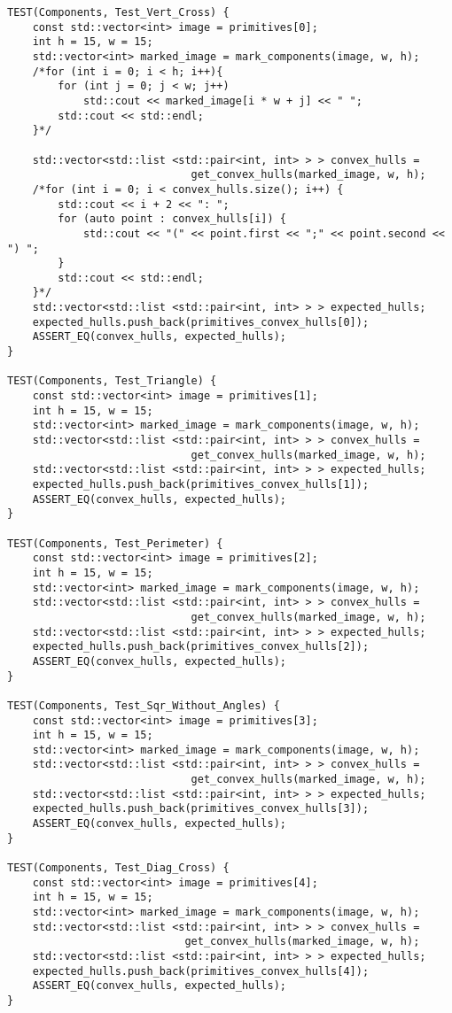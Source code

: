 \documentclass{report}
\begin{document}
\begin{lstlisting}
TEST(Components, Test_Vert_Cross) {
    const std::vector<int> image = primitives[0];
    int h = 15, w = 15;
    std::vector<int> marked_image = mark_components(image, w, h);
    /*for (int i = 0; i < h; i++){
        for (int j = 0; j < w; j++)
            std::cout << marked_image[i * w + j] << " ";
        std::cout << std::endl;
    }*/

    std::vector<std::list <std::pair<int, int> > > convex_hulls =
                             get_convex_hulls(marked_image, w, h);
    /*for (int i = 0; i < convex_hulls.size(); i++) {
        std::cout << i + 2 << ": ";
        for (auto point : convex_hulls[i]) {
            std::cout << "(" << point.first << ";" << point.second << ") ";
        }
        std::cout << std::endl;
    }*/
    std::vector<std::list <std::pair<int, int> > > expected_hulls;
    expected_hulls.push_back(primitives_convex_hulls[0]);
    ASSERT_EQ(convex_hulls, expected_hulls);
}

TEST(Components, Test_Triangle) {
    const std::vector<int> image = primitives[1];
    int h = 15, w = 15;
    std::vector<int> marked_image = mark_components(image, w, h);
    std::vector<std::list <std::pair<int, int> > > convex_hulls =
                             get_convex_hulls(marked_image, w, h);
    std::vector<std::list <std::pair<int, int> > > expected_hulls;
    expected_hulls.push_back(primitives_convex_hulls[1]);
    ASSERT_EQ(convex_hulls, expected_hulls);
}

TEST(Components, Test_Perimeter) {
    const std::vector<int> image = primitives[2];
    int h = 15, w = 15;
    std::vector<int> marked_image = mark_components(image, w, h);
    std::vector<std::list <std::pair<int, int> > > convex_hulls =
                             get_convex_hulls(marked_image, w, h);
    std::vector<std::list <std::pair<int, int> > > expected_hulls;
    expected_hulls.push_back(primitives_convex_hulls[2]);
    ASSERT_EQ(convex_hulls, expected_hulls);
}

TEST(Components, Test_Sqr_Without_Angles) {
    const std::vector<int> image = primitives[3];
    int h = 15, w = 15;
    std::vector<int> marked_image = mark_components(image, w, h);
    std::vector<std::list <std::pair<int, int> > > convex_hulls =
                             get_convex_hulls(marked_image, w, h);
    std::vector<std::list <std::pair<int, int> > > expected_hulls;
    expected_hulls.push_back(primitives_convex_hulls[3]);
    ASSERT_EQ(convex_hulls, expected_hulls);
}

TEST(Components, Test_Diag_Cross) {
    const std::vector<int> image = primitives[4];
    int h = 15, w = 15;
    std::vector<int> marked_image = mark_components(image, w, h);
    std::vector<std::list <std::pair<int, int> > > convex_hulls =
                            get_convex_hulls(marked_image, w, h);
    std::vector<std::list <std::pair<int, int> > > expected_hulls;
    expected_hulls.push_back(primitives_convex_hulls[4]);
    ASSERT_EQ(convex_hulls, expected_hulls);
}


\end{lstlisting}
\end{document}
